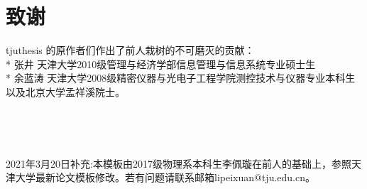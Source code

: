 
\chapter*{致\qquad 谢}

tjuthesis 的原作者们作出了前人栽树的不可磨灭的贡献：\\
* 张井 天津大学2010级管理与经济学部信息管理与信息系统专业硕士生\\
* 余蓝涛 天津大学2008级精密仪器与光电子工程学院测控技术与仪器专业本科生\\
以及北京大学孟祥溪院士。

~

~

2021年3月20日补充:本模板由2017级物理系本科生李佩璇在前人的基础上，参照天津大学最新论文模板修改。若有问题请联系邮箱lipeixuan@tju.edu.cn。